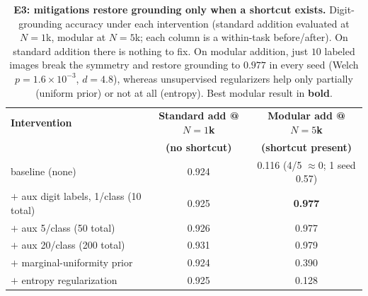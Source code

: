 \begin{table}[t]
    \centering
    \begin{tabular}{@{}lcc@{}}
        \toprule
        \textbf{Intervention} & \textbf{Standard add @$N{=}1$k} & \textbf{Modular add @$N{=}5$k} \\
         & \textbf{(no shortcut)} & \textbf{(shortcut present)} \\
        \midrule
        baseline (none)                              & 0.924 & 0.116 \footnotesize{(4/5 $\approx$0; 1 seed 0.57)} \\
        $+$ aux digit labels, 1/class (10 total)     & 0.925 & \textbf{0.977} \\
        $+$ aux 5/class (50 total)                   & 0.926 & 0.977 \\
        $+$ aux 20/class (200 total)                 & 0.931 & 0.979 \\
        $+$ marginal-uniformity prior                & 0.924 & 0.390 \\
        $+$ entropy regularization                   & 0.925 & 0.128 \\
        \bottomrule
    \end{tabular}
    \caption{\textbf{E3: mitigations restore grounding only when a shortcut exists.} Digit-grounding
    accuracy under each intervention (standard addition evaluated at $N{=}1$k, modular at $N{=}5$k; each
    column is a within-task before/after). On standard addition there is nothing to fix. On modular
    addition, just $10$ labeled images break the symmetry and restore grounding to $0.977$ in every seed
    (Welch $p{=}1.6{\times}10^{-3}$, $d{=}4.8$), whereas unsupervised regularizers help only partially
    (uniform prior) or not at all (entropy). Best modular result in \textbf{bold}.}
    \label{tab:e3}
\end{table}
